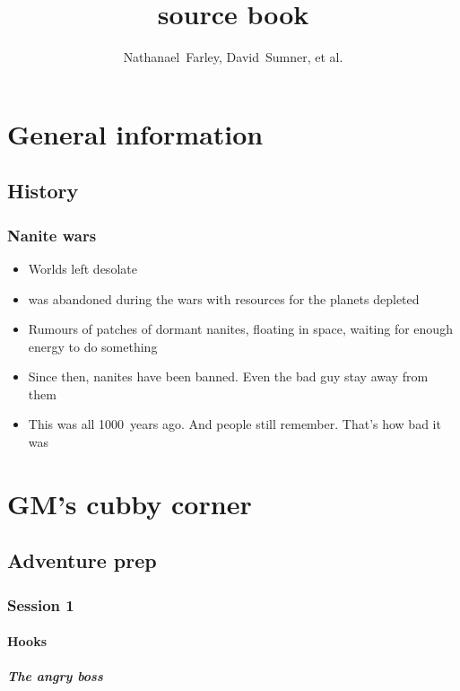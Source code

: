 \documentclass[a4paper,twocolumn,oneside]{memoir}
\title{\system{51} source book}
\author{Nathanael~Farley, David~Sumner, et al.}
\begin{document}
\part{General information}
\label{part:general-information}

\chapter{History}
\label{cha:history}

\section{Nanite wars}
\label{sec:nanite-wars}

\begin{itemize}
\item Worlds left desolate
\item {} was abandoned during the wars with resources for the planets depleted
\item Rumours of patches of dormant nanites, floating in space, waiting for
  enough energy to do something
\item Since then, nanites have been banned. Even the bad guy stay away from them
\item This was all 1000~years ago. And people still remember. That's how bad it was
\end{itemize}

\part{GM's cubby corner}
\label{part:gms-cubby-corner}


\chapter{Adventure prep}
\label{cha:adventure-prep}

\section{Session 1}

\subsection{Hooks}
\label{sec:hooks}

\subsubsection{The angry boss}
\label{sec:angry-boss}
\end{document}
